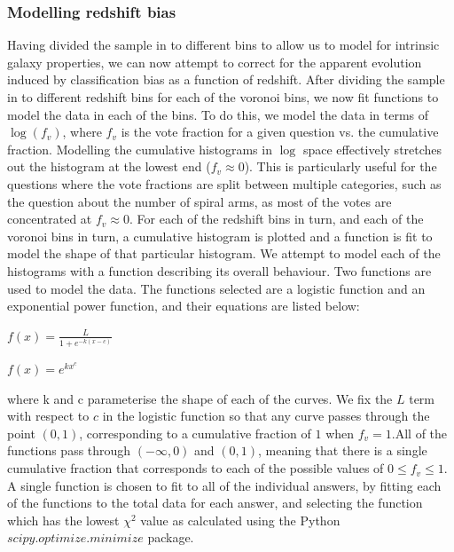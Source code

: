 \documentclass[useAMS,usenatbib]{mn2e}
\begin{document}
\subsubsection{Modelling redshift bias}

Having divided the sample in to different bins to allow us to model for intrinsic galaxy properties, we can now attempt to correct for the apparent evolution induced by classification bias as a function of redshift. After dividing the sample in to different redshift bins for each of the voronoi bins, we now fit functions to model the data in each of the bins. To do this, we model the data in terms of $\log(f_v)$, where $f_v$ is the vote fraction for a given question vs. the cumulative fraction. Modelling the cumulative histograms in $\log$ space effectively stretches out the histogram at the lowest end ($f_v \approx 0$). This is particularly useful for the questions where the vote fractions are split between multiple categories, such as the question about the number of spiral arms, as most of the votes are concentrated at $f_v \approx 0$. For each of the redshift bins in turn, and each of the voronoi bins in turn, a cumulative histogram is plotted and a function is fit to model the shape of that particular histogram. We attempt to model each of the histograms with a function describing its overall behaviour. Two functions are used to model the data. The functions selected are a logistic function and an exponential power function, and their equations are listed below:

\begin{center}
$f(x) = \frac{L}{1+e^{-k(x-c)}}$
\end{center}

\begin{center}
$f(x) = e^{kx^{c}}$
\end{center}

where k and c parameterise the shape of each of the curves. We fix the $L$ term with respect to $c$ in the logistic function so that any curve passes through the point $(0,1)$, corresponding to a cumulative fraction of $1$ when $f_v = 1$.All of the functions pass through $(-\infty,0)$ and $(0,1)$, meaning that there is a single cumulative fraction that corresponds to each of the possible values of $0 \leq f_v \leq 1$. A single function is chosen to fit to all of the individual answers, by fitting each of the functions to the total data for each answer, and selecting the function which has the lowest $\chi^2$ value as calculated using the Python $scipy.optimize.minimize$ package.
\end{document}
